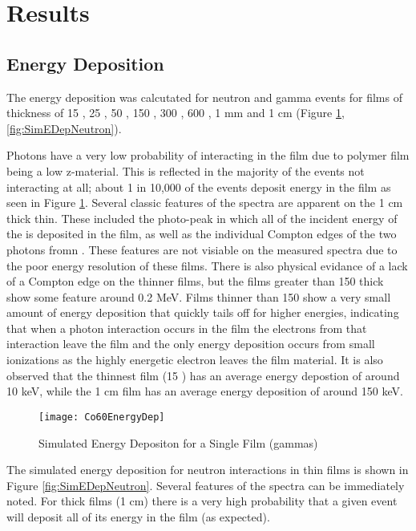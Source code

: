 \section{Results}
\label{sec:Results}

\subsection{Energy Deposition}
The energy deposition was calcutated for neutron and gamma events for films of thickness of 15 \micron, 25 \micron, 50 \micron, 150 \micron, 300 \micron, 600 \micron, 1 mm and 1 cm (Figure \ref{fig:SimEDepGamma}, \ref{fig:SimEDepNeutron}).  

Photons have a very low probability of interacting in the film due to polymer film being a low z-material.
This is reflected in the majority of the events not interacting at all; about 1 in 10,000 of the events deposit energy in the film as seen in Figure \ref{fig:SimEDepGamma}.
Several classic features of the spectra are apparent on the 1 cm thick thin.
These included the photo-peak in which all of the incident energy of the  is deposited in the film, as well as the individual Compton edges of the two photons fromn .
These features are not visiable on the measured spectra due to the poor energy resolution of these films.
There is also physical evidance of a lack of a Compton edge on the thinner films, but the films greater than 150 \micron thick show some feature around 0.2 MeV.
Films thinner than 150 \micron show a very small amount of energy deposition that quickly tails off for higher energies, indicating that when a photon interaction occurs in the film the electrons from that interaction leave the film and the only energy deposition occurs from small ionizations as the highly energetic electron leaves the film material.
It is also observed that the thinnest film (15 \micron) has an average energy depostion of around 10 keV, while the 1 cm film has an average energy deposition of around 150 keV.
\begin{figure}[h]
    \texttt{[image: Co60EnergyDep]}
	\caption{Simulated Energy Depositon for a Single Film (gammas)}
    \label{fig:SimEDepGamma}
\end{figure}
The simulated energy deposition for neutron interactions in thin films is shown in Figure \ref{fig:SimEDepNeutron}.
Several features of the spectra can be immediately noted.
For thick films (1 cm) there is a very high probability that a given event will deposit all of its energy in the film (as expected).
